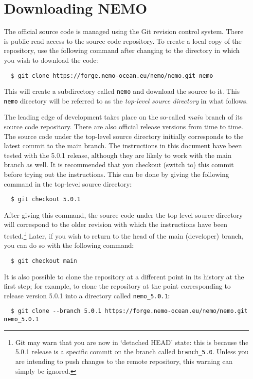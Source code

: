 \section{Downloading NEMO}
\label{sec:download}

The official \NEMOSIcu{} source code is managed using the Git revision control system.
There is public read access to the source code repository.
To create a local copy of the repository, use the following command after changing to the directory in which you wish to download the code:

\begin{verbatim}
  $ git clone https://forge.nemo-ocean.eu/nemo/nemo.git nemo
\end{verbatim}

This will create a subdirectory called \verb|nemo| and download the \NEMOSIcu{} source to it.
This \verb|nemo| directory will be referred to as the \textit{top-level source directory} in what follows.

The leading edge of \NEMOSIcu{} development takes place on the so-called \textit{main} branch of its source code repository.
There are also official release versions from time to time.
The source code under the top-level source directory initially corresponds to the latest commit to the main branch.
The instructions in this document have been tested with the 5.0.1 release, although they are likely to work with the main branch as well.
It is recommended that you checkout (switch to) this commit before trying out the instructions.
This can be done by giving the following command in the top-level source directory:

\begin{verbatim}
  $ git checkout 5.0.1
\end{verbatim}

After giving this command, the source code under the top-level source directory will correspond to the older revision with which the instructions have been tested.\footnote{
    Git may warn that you are now in `detached HEAD' state: this is because the 5.0.1 release is a specific commit on the branch called \texttt{branch\_5.0}.
    Unless you are intending to push changes to the remote repository, this warning can simply be ignored.
}
Later, if you wish to return to the head of the main (developer) branch, you can do so with the following command:

\begin{verbatim}
  $ git checkout main
\end{verbatim}

It is also possible to clone the repository at a different point in its history at the first step; for example, to clone the repository at the point corresponding to release version 5.0.1 into a directory called \verb|nemo_5.0.1|:

\begin{verbatim}
  $ git clone --branch 5.0.1 https://forge.nemo-ocean.eu/nemo/nemo.git nemo_5.0.1
\end{verbatim}
